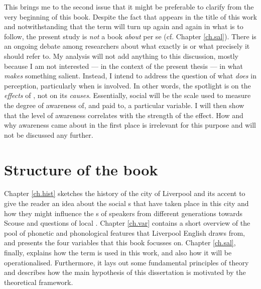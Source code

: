 This brings me to the second issue that it might be preferable to clarify from the very beginning of this book.
Despite the fact that \emph{} appears in the title of this work and notwithstanding that the term will turn up again and again in what is to follow, the present study is \emph{not} a book \emph{about}  per se (cf. Chapter \ref{ch.sal}).
There is an ongoing debate among researchers about what exactly  is or what precisely it should refer to.
My analysis will not add anything to this discussion, mostly because I am not interested --- in the context of the present thesis --- in what \emph{makes} something salient.
Instead, I intend to address the question of what  \emph{does} in perception, particularly when  is involved.
In other words, the spotlight is on the \emph{effects} of , not on its \emph{causes}.
Essentially, social  will be the scale used to measure the degree of awareness of, and  paid to, a particular variable.
I will then show that the level of awareness correlates with the strength of the  effect.
How and why awareness came about in the first place is irrelevant for this purpose and will not be discussed any further.

\section{Structure of the book}
\label{sec.intro.structure}

Chapter \ref{ch.hist} sketches the history of the city of Liverpool and its accent to give the reader an idea about the social s that have taken place in this city and how they might influence the s of speakers from different generations towards Scouse and questions of local .
Chapter \ref{ch.var} contains a short overview of the pool of phonetic and phonological features that Liverpool English draws from, and presents the four variables that this book focusses on.
Chapter \ref{ch.sal}, finally, explains how the term \emph{} is used in this work, and also how it will be operationalised.
Furthermore, it lays out some fundamental principles of  theory and describes how the main hypothesis of this dissertation is motivated by the theoretical framework.

